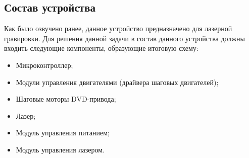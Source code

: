 \subsection{Состав устройства}

Как было озвучено ранее, данное устройство предназначено для лазерной гравировки. 
Для решения данной задачи в состав данного устройства должны входить следующие компоненты, образующие итоговую схему:

\begin{itemize}
    \item Микроконтроллер;
    \item Модули управления двигателями (драйвера шаговых двигателей);
    \item Шаговые моторы DVD-привода;
    \item Лазер;
    \item Модуль управления питанием;
    \item Модуль управления лазером.
\end{itemize}
